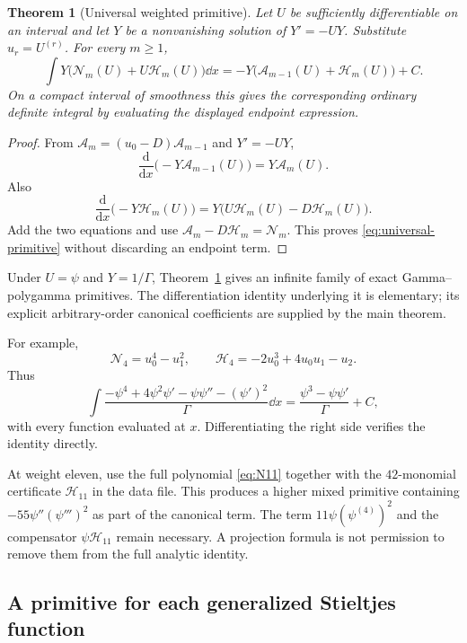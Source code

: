 \documentclass[11pt,letterpaper]{article}
\numberwithin{equation}{section}
\theoremstyle{plain}
\newtheorem{theorem}{Theorem}[section]
\theoremstyle{definition}
\theoremstyle{remark}
\newcommand{\Ac}{\mathcal A}\newcommand{\Nc}{\mathcal N}\newcommand{\Hc}{\mathcal H}
\begin{document}
\begin{theorem}[Universal weighted primitive]\label{thm:primitive}
Let $U$ be sufficiently differentiable on an interval and let $Y$ be a nonvanishing solution of $Y'=-UY$. Substitute $u_r=U^{(r)}$. For every $m\ge1$,
\begin{equation}\label{eq:universal-primitive}
 \boxed{\displaystyle
 \int Y\bigl(\Nc_m(U)+U\Hc_m(U)\bigr)\dd x
 =-Y\bigl(\Ac_{m-1}(U)+\Hc_m(U)\bigr)+C.}
\end{equation}
On a compact interval of smoothness this gives the corresponding ordinary definite integral by evaluating the displayed endpoint expression.
\end{theorem}
\begin{proof}
From $\Ac_m=(u_0-D)\Ac_{m-1}$ and $Y'=-UY$,
\[
 \frac{\mathrm d}{\mathrm dx}\bigl(-Y\Ac_{m-1}(U)\bigr)=Y\Ac_m(U).
\]
Also
\[
 \frac{\mathrm d}{\mathrm dx}\bigl(-Y\Hc_m(U)\bigr)
 =Y\bigl(U\Hc_m(U)-D\Hc_m(U)\bigr).
\]
Add the two equations and use $\Ac_m-D\Hc_m=\Nc_m$. This proves \eqref{eq:universal-primitive} without discarding an endpoint term.
\end{proof}

Under $U=\psi$ and $Y=1/\Gamma$, Theorem~\ref{thm:primitive} gives an infinite family of exact Gamma--polygamma primitives. The differentiation identity underlying it is elementary; its explicit arbitrary-order canonical coefficients are supplied by the main theorem.

For example,
\[
 \Nc_4=u_0^4-u_1^2,\qquad
 \Hc_4=-2u_0^3+4u_0u_1-u_2.
\]
Thus
\begin{equation}\label{eq:gamma4-primitive}
 \int\frac{-\psi^4+4\psi^2\psi'-\psi\psi''-(\psi')^2}{\Gamma}\dd x
 =\frac{\psi^3-\psi\psi'}{\Gamma}+C,
\end{equation}
with every function evaluated at $x$. Differentiating the right side verifies the identity directly.

At weight eleven, use the full polynomial \eqref{eq:N11} together with the $42$-monomial certificate $\Hc_{11}$ in the data file. This produces a higher mixed primitive containing $-55\psi''(\psi''')^2$ as part of the canonical term. The term $11\psi(\psi^{(4)})^2$ and the compensator $\psi\Hc_{11}$ remain necessary. A projection formula is not permission to remove them from the full analytic identity.

\subsection{A primitive for each generalized Stieltjes function}
\end{document}
